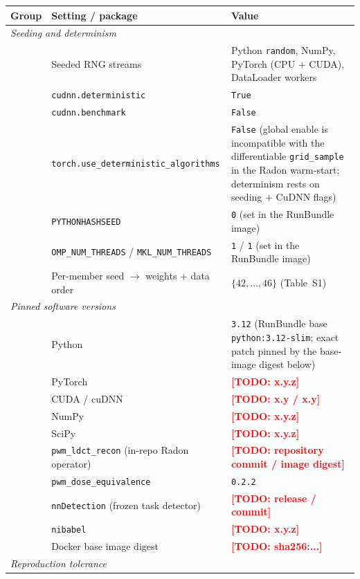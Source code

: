 \documentclass{article}
\newcommand{\todo}[1]{\textcolor{red}{\textbf{[TODO: #1]}}}
\begin{document}
\begin{table}[h]
  \centering
  \small
  \begin{tabular}{lll}
    \toprule
    \textbf{Group} & \textbf{Setting / package} & \textbf{Value} \\
    \midrule
    \multicolumn{3}{l}{\emph{Seeding and determinism}} \\
    & Seeded RNG streams & Python \texttt{random}, NumPy, PyTorch (CPU + CUDA), DataLoader workers \\
    & \texttt{cudnn.deterministic} & \texttt{True} \\
    & \texttt{cudnn.benchmark} & \texttt{False} \\
    & \texttt{torch.use\_deterministic\_algorithms} & \texttt{False} (global enable is incompatible with the differentiable \texttt{grid\_sample} in the Radon warm-start; determinism rests on seeding $+$ CuDNN flags) \\
    & \texttt{PYTHONHASHSEED} & \texttt{0} (set in the RunBundle image) \\
    & \texttt{OMP\_NUM\_THREADS} / \texttt{MKL\_NUM\_THREADS} & \texttt{1} / \texttt{1} (set in the RunBundle image) \\
    & Per-member seed $\to$ weights + data order & $\{42,\dots,46\}$ (Table~S1) \\
    \midrule
    \multicolumn{3}{l}{\emph{Pinned software versions}} \\
    & Python                  & \texttt{3.12} (RunBundle base \texttt{python:3.12-slim}; exact patch pinned by the base-image digest below) \\
    & PyTorch                 & \todo{x.y.z} \\
    & CUDA / cuDNN            & \todo{x.y / x.y} \\
    & NumPy                   & \todo{x.y.z} \\
    & SciPy                   & \todo{x.y.z} \\
    & \texttt{pwm\_ldct\_recon} (in-repo Radon operator) & \todo{repository commit / image digest} \\
    & \texttt{pwm\_dose\_equivalence}         & \texttt{0.2.2} \\
    & \texttt{nnDetection} (frozen task detector) & \todo{release / commit} \\
    & \texttt{nibabel}        & \todo{x.y.z} \\
    & Docker base image digest & \todo{sha256:...} \\
    \midrule
    \multicolumn{3}{l}{\emph{Reproduction tolerance}} \\

\end{tabular}
\end{table}
\end{document}
